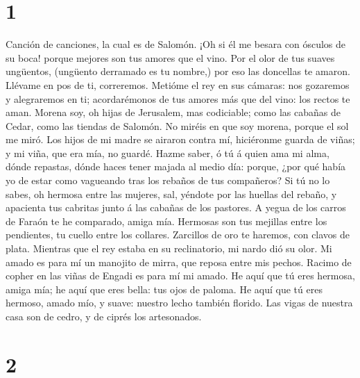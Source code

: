 \hypertarget{section}{%
\section{1}\label{section}}

 Canción de canciones, la cual es de Salomón. 
¡Oh si él me besara con ósculos de su boca! porque mejores son tus
amores que el vino.  Por el olor de tus suaves ungüentos,
(ungüento derramado es tu nombre,) por eso las doncellas te amaron.
 Llévame en pos de ti, correremos. Metióme el rey en sus
cámaras: nos gozaremos y alegraremos en ti; acordarémonos de tus amores
más que del vino: los rectos te aman.  Morena soy, oh hijas
de Jerusalem, mas codiciable; como las cabañas de Cedar, como las
tiendas de Salomón.  No miréis en que soy morena, porque el
sol me miró. Los hijos de mi madre se airaron contra mí, hiciéronme
guarda de viñas; y mi viña, que era mía, no guardé.  Hazme
saber, ó tú á quien ama mi alma, dónde repastas, dónde haces tener
majada al medio día: porque, ¿por qué había yo de estar como vagueando
tras los rebaños de tus compañeros?  Si tú no lo sabes, oh
hermosa entre las mujeres, sal, yéndote por las huellas del rebaño, y
apacienta tus cabritas junto á las cabañas de los pastores. 
A yegua de los carros de Faraón te he comparado, amiga mía.
 Hermosas son tus mejillas entre los pendientes, tu cuello
entre los collares.  Zarcillos de oro te haremos, con
clavos de plata.  Mientras que el rey estaba en su
reclinatorio, mi nardo dió su olor.  Mi amado es para mí un
manojito de mirra, que reposa entre mis pechos.  Racimo de
copher en las viñas de Engadi es para mí mi amado.  He aquí
que tú eres hermosa, amiga mía; he aquí que eres bella: tus ojos de
paloma.  He aquí que tú eres hermoso, amado mío, y suave:
nuestro lecho también florido.  Las vigas de nuestra casa
son de cedro, y de ciprés los artesonados.

\hypertarget{section-1}{%
\section{2}\label{section-1}}

